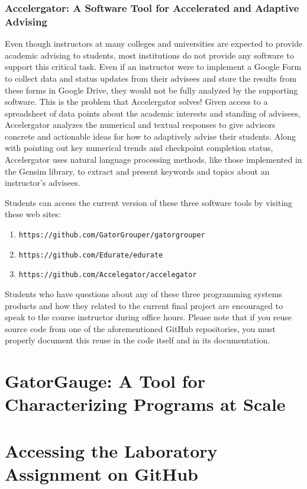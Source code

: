 \documentclass[11pt]{article}
\newcommand{\url}[1]{\lstinline{#1}}
\begin{document}
\subsubsection*{Accelergator: A Software Tool for Accelerated and Adaptive Advising}

Even though instructors at many colleges and universities are expected to provide academic advising to students, most
institutions do not provide any software to support this critical task. Even if an instructor were to implement a Google
Form to collect data and status updates from their advisees and store the results from these forms in Google Drive, they
would not be fully analyzed by the supporting software. This is the problem that Accelergator solves! Given access to a
spreadsheet of data points about the academic interests and standing of advisees, Accelergator analyzes the numerical
and textual responses to give advisors concrete and actionable ideas for how to adaptively advise their students. Along
with pointing out key numerical trends and checkpoint completion status, Accelergator uses natural language processing
methods, like those implemented in the Gensim library, to extract and present keywords and topics about an instructor's
advisees.

\noindent
Students can access the current version of these three software tools by visiting these web sites:

\begin{enumerate}
  \item \url{https://github.com/GatorGrouper/gatorgrouper}
  \item \url{https://github.com/Edurate/edurate}
  \item \url{https://github.com/Accelegator/accelegator}
\end{enumerate}

\noindent Students who have questions about any of these three programming systems products and how they related to the
current final project are encouraged to speak to the course instructor during office hours. Please note that if you
reuse source code from one of the aforementioned GitHub repositories, you must properly document this reuse in the code
itself and in its documentation.

\section*{GatorGauge: A Tool for Characterizing Programs at Scale}


\section*{Accessing the Laboratory Assignment on GitHub}
\end{document}
